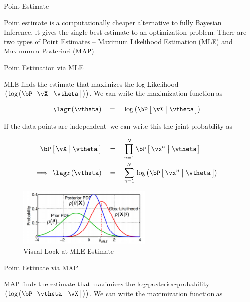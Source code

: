 \documentclass{article}
\begin{document}
\makeheader

\begin{ssection}{Point Estimate}

	Point estimate is a computationally cheaper alternative to fully Bayesian Inference. It gives the single best estimate to an optimization problem. There are two types of Point Estimates -- Maximum Likelihood Estimation (MLE) and Maximum-a-Posteriori (MAP)

	\begin{ssubsection}{Point Estimation via MLE}

		MLE finds the estimate that maximizes the log-Likelihood $\para{\log{\prob{\vX \pipe \vtheta}}}$. We can write the maximization function as

		\begin{align*}
			\func{\lagr}{\vtheta}	\eq	\log{\prob{\vX \pipe \vtheta}}
		\end{align*}

		If the data points are independent, we can write this the joint probability as

		\begin{align*}
			\prob{\vX \pipe \vtheta}		&\eq	\prod_{n = 1}^N \prob{\vx^n \pipe \vtheta} \\
			\implies \func{\lagr}{\vtheta}	&\eq	\sum_{n = 1}^N \log{\prob{\vx^n \pipe \vtheta}}
		\end{align*}

		\begin{figure}[h!]
			\centering
			\includegraphics[width=250px]{includes/scribe02/mle-estimate.png}
			\caption{Visual Look at MLE Estimate}
		\end{figure}


	\end{ssubsection}

	\begin{ssubsection}{Point Estimate via MAP}

		MAP finds the estimate that maximizes the log-posterior-probability $\para{\log{\prob{\vtheta \pipe \vX}}}$. We can write the maximization function as


\end{ssubsection}
\end{ssection}
\end{document}
